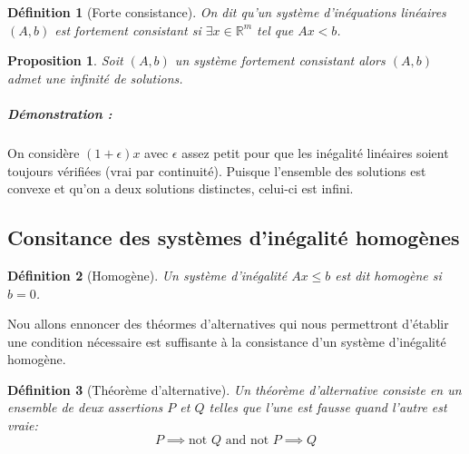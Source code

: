 \documentclass[10pt,a4paper]{article}
\newtheorem{mydef}{Définition}
\newtheorem{prop}{Proposition}
\begin{document}
\begin{mydef}[Forte consistance]
On dit qu'un système d'inéquations linéaires $(A,b)$ est fortement consistant si $\exists x \in \mathbb{R}^m$ tel que $Ax < b$.
\end{mydef}

\begin{prop}
Soit $(A,b)$ un système fortement consistant alors $(A,b)$ admet une infinité de solutions.
\end{prop}
\subparagraph{Démonstration :} On considère $(1+\epsilon) x$ avec $\epsilon$ assez petit pour que les inégalité linéaires soient toujours vérifiées (vrai par continuité).
Puisque l'ensemble des solutions est convexe et qu'on a deux solutions distinctes, celui-ci est infini.

\subsection{Consitance des systèmes d'inégalité homogènes}
\begin{mydef}[Homogène]
  Un système d'inégalité $Ax \leq b$ est dit homogène si $b=0$.
\end{mydef}

Nou allons ennoncer des théormes d'alternatives qui nous permettront d'établir une condition nécessaire est suffisante à la consistance d'un système d'inégalité homogène.

\begin{mydef}[Théorème d'alternative]
  Un théorème d'alternative consiste en un ensemble de deux assertions $P$ et $Q$ telles que l'une est fausse quand l'autre est vraie:
\[ P \implies \text{not } Q \text{ and } \text{not } P \implies Q \]
\end{mydef}

\end{document}
